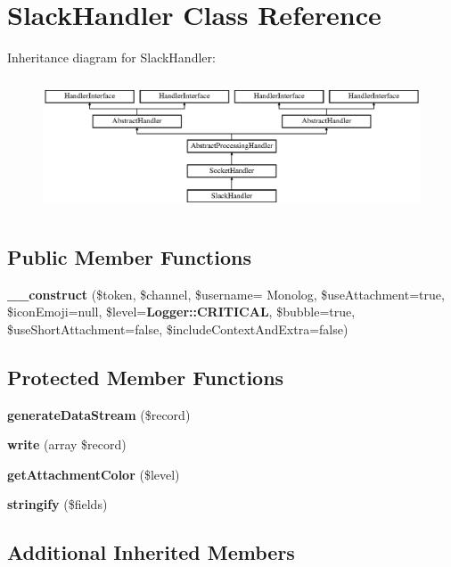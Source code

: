 \section{Slack\+Handler Class Reference}
\label{class_monolog_1_1_handler_1_1_slack_handler}
Inheritance diagram for Slack\+Handler\+:\begin{figure}[H]
\begin{center}
\leavevmode
\includegraphics[height=4.000000cm]{class_monolog_1_1_handler_1_1_slack_handler}
\end{center}
\end{figure}
\subsection*{Public Member Functions}
\begin{DoxyCompactItemize}
\item 
{\bf \+\_\+\+\_\+construct} (\$token, \$channel, \$username= \textquotesingle{}Monolog\textquotesingle{}, \$use\+Attachment=true, \$icon\+Emoji=null, \$level={\bf Logger\+::\+C\+R\+I\+T\+I\+C\+A\+L}, \$bubble=true, \$use\+Short\+Attachment=false, \$include\+Context\+And\+Extra=false)
\end{DoxyCompactItemize}
\subsection*{Protected Member Functions}
\begin{DoxyCompactItemize}
\item 
{\bf generate\+Data\+Stream} (\$record)
\item 
{\bf write} (array \$record)
\item 
{\bf get\+Attachment\+Color} (\$level)
\item 
{\bf stringify} (\$fields)
\end{DoxyCompactItemize}
\subsection*{Additional Inherited Members}


